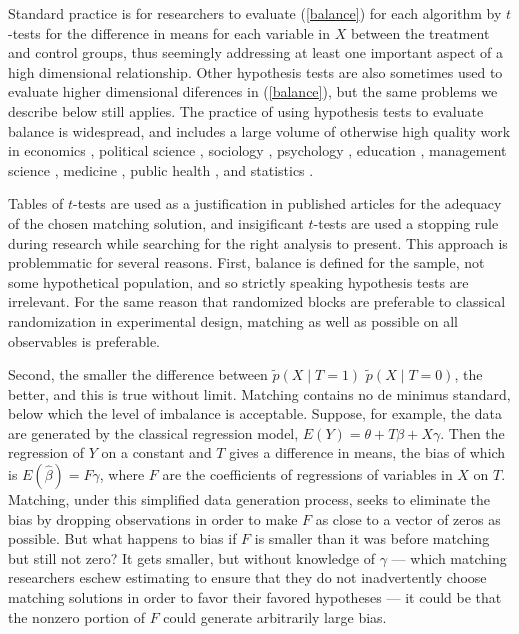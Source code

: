 \documentclass[11pt,titlepage]{article}
\begin{document}
Standard practice is for researchers to evaluate (\ref{balance}) for
each algorithm by $t$-tests for the difference in means for each
variable in $X$ between the treatment and control groups, thus
seemingly addressing at least one important aspect of a high
dimensional relationship.  Other hypothesis tests are also sometimes
used to evaluate higher dimensional diferences in (\ref{balance}), but
the same problems we describe below still applies.  The practice of
using hypothesis tests to evaluate balance is widespread, and includes
a large volume of otherwise high quality work in economics
\citep{MilFreMcH03,BlaSmi04,AgoDyn04,DehWah99, DehWah02,SmiTod05},
political science \citep{Imai05,SimHop05, Lassen05}, sociology
\citep{Harding03,DiPGan04,LunSmi05}, psychology
\citep{HavNag05,HilWalBro05,YosMagBos03,JonDAgGon04,McCRidMor04},
education \citep{Crosnoe05,SchBuc03}, management science
\citep{FreMil04, Villalonga04,WanSchAvo05}, medicine
\citep{WanSchAvo05, MacRivJur06,LinPekWan06,ManTudDie06, PetRoeMul06,
  ShiLitPot06,SabCanGib05,PerUndZho00,AusMam06,AusMamStu05}, public
health \citep{NovReaRau06,ElBGilWu05,LauSmiSta00,BinBreEar05}, and
statistics \citep{LuZanHor01}.

Tables of $t$-tests are used as a justification in published articles
for the adequacy of the chosen matching solution, and insigificant
$t$-tests are used a stopping rule during research while searching for
the right analysis to present.  This approach is problemmatic for
several reasons.  First, balance is defined for the sample, not some
hypothetical population, and so strictly speaking hypothesis tests are
irrelevant.  For the same reason that randomized blocks are preferable
to classical randomization in experimental design, matching as well as
possible on all observables is preferable.  

Second, the smaller the difference between $\tilde p(X\mid T=1)$
$\tilde p(X\mid T=0)$, the better, and this is true without limit.
Matching contains no de minimus standard, below which the level of
imbalance is acceptable.  Suppose, for example, the data are generated
by the classical regression model, $E(Y)= \theta + T\beta + X\gamma$.
Then the regression of $Y$ on a constant and $T$ gives a difference in
means, the bias of which is $E(\hat\beta) = F\gamma$, where $F$ are
the coefficients of regressions of variables in $X$ on $T$.  Matching,
under this simplified data generation process, seeks to eliminate the
bias by dropping observations in order to make $F$ as close to a
vector of zeros as possible.  But what happens to bias if $F$ is
smaller than it was before matching but still not zero?  It gets
smaller, but without knowledge of $\gamma$ --- which matching
researchers eschew estimating to ensure that they do not inadvertently
choose matching solutions in order to favor their favored hypotheses
--- it could be that the nonzero portion of $F$ could generate
arbitrarily large bias.
\end{document}
